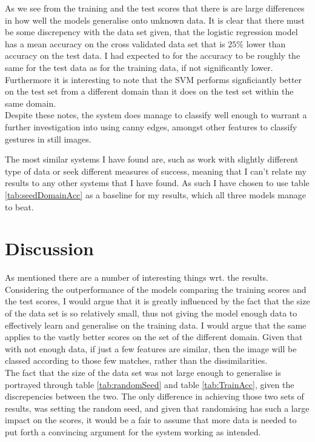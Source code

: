 \documentclass[11pt, a4paper]{article}
\begin{document}
As we see from the training and the test scores that there is are large differences in how well the models generalise onto unknown data. It is clear that there must be some discrepency with the data set given, that the logistic regression model has a mean accuracy on the cross validated data set that is \(25\%\) lower than accuracy on the test data. I had expected to for the accuracy to be roughly the same for the test data as for the training data, if not significantly lower. Furthermore it is interesting to note that the SVM performs signficiantly better on the test set from a different domain than it does on the test set within the same domain.\\
Despite these notes, the system does manage to classify well enough to warrant a further investigation into using canny edges, amongst other features to classify gestures in still images.

The most similar systems I have found are, such as  work with slightly different type of data or seek different measures of success, meaning that I can't relate my results to any other systems that I have found. As such I have chosen to use table \ref{tab:seedDomainAcc} as a baseline for my results, which all three models manage to beat.\\

\section{Discussion}
As mentioned there are a number of interesting things wrt. the results. Considering the outperformance of the models comparing the training scores and the test scores, I would argue that it is greatly influenced by the fact that the size of the data set is so relatively small, thus not giving the model enough data to effectively learn and generalise on the training data. I would argue that the same applies to the vastly better scores on the set of the different domain. Given that with not enough data, if just a few features are similar, then the image will be classed according to those few matches, rather than the dissimilarities.\\
The fact that the size of the data set was not large enough to generalise is portrayed through table \ref{tab:randomSeed} and table \ref{tab:TrainAcc}, given the discrepencies between the two. The only difference in achieving those two sets of results, was setting the random seed, and given that randomising has such a large impact on the scores, it would be a fair to assume that more data is needed to put forth a convincing argument for the system working as intended.\\
\end{document}
